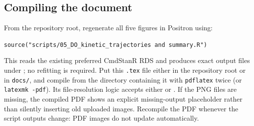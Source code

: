 \documentclass[11pt,a4paper]{article}
\begin{document}
\subsection*{Compiling the document}
From the repository root, regenerate all five figures in Positron using:

\begin{center}
\small\texttt{source("scripts/05\_DO\_kinetic\_trajectories and summary.R")}
\end{center}
 This reads the existing preferred CmdStanR RDS and produces exact output files under ; no refitting is required. Put this \texttt{.tex} file either in the repository root or in \texttt{docs/}, and compile from the directory containing it with \texttt{pdflatex} twice (or \texttt{latexmk -pdf}). Its file-resolution logic accepts either  or . If the PNG files are missing, the compiled PDF shows an explicit missing-output placeholder rather than silently inserting old uploaded images. Recompile the PDF whenever the script outputs change: PDF images do not update automatically.

\appendix
\end{document}
